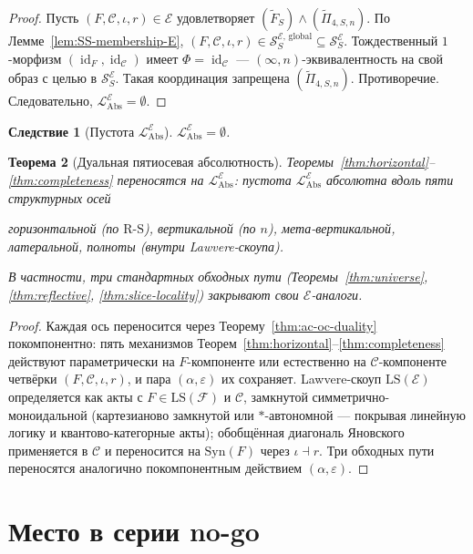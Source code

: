 \documentclass[11pt]{article}
\theoremstyle{plain}
\newtheorem{theorem}{Теорема}[section]
\newtheorem{corollary}[theorem]{Следствие}
\theoremstyle{definition}
\newcommand{\RS}{\mathrm{R\text{-}S}}
\newcommand{\cS}{\mathcal{S}}
\newcommand{\cF}{\mathcal{F}}
\newcommand{\cC}{\mathcal{C}}
\newcommand{\LAbs}{\mathcal{L}_{\mathrm{Abs}}}
\newcommand{\Syn}{\mathrm{Syn}}
\newcommand{\cE}{\mathcal{E}}
\newcommand{\LAbsE}{\LAbs^{\cE}}
\newcommand{\SSE}{\cS_{S}^{\cE}}
\DeclareMathOperator{\id}{id}
\newcommand{\SSEglobal}{\cS_{S}^{\cE,\,\mathrm{global}}}
\begin{document}
\begin{proof}
Пусть $(F, \cC, \iota, r) \in \cE$ удовлетворяет $(\tilde{F}_S) \wedge (\tilde{\Pi}_{4, S, n})$. По Лемме~\ref{lem:SS-membership-E}, $(F, \cC, \iota, r) \in \SSEglobal \subseteq \SSE$. Тождественный $1$-морфизм $(\id_F, \id_\cC)$ имеет $\Phi = \id_\cC$ — $(\infty, n)$-эквивалентность на свой образ с целью в $\SSE$. Такая координация запрещена $(\tilde{\Pi}_{4, S, n})$. Противоречие. Следовательно, $\LAbsE = \emptyset$.
\end{proof}

\begin{corollary}[Пустота $\LAbsE$]\label{cor:level6-empty-cE}
$\LAbsE = \emptyset$.
\end{corollary}

\begin{theorem}[Дуальная пятиосевая абсолютность]\label{thm:dual-five-axis}
Теоремы~\ref{thm:horizontal}--\ref{thm:completeness} переносятся на $\LAbs^\cE$: пустота $\LAbs^\cE$ абсолютна вдоль пяти структурных осей
\begin{center}
\emph{горизонтальной} (по $\RS$), \quad \emph{вертикальной} (по $n$), \quad \emph{мета-вертикальной}, \quad \emph{латеральной}, \quad \emph{полноты} (внутри Lawvere-скоупа).
\end{center}
В частности, три стандартных обходных пути (Теоремы~\ref{thm:universe}, \ref{thm:reflective}, \ref{thm:slice-locality}) закрывают свои $\cE$-аналоги.
\end{theorem}

\begin{proof}
Каждая ось переносится через Теорему~\ref{thm:ac-oc-duality} покомпонентно: пять механизмов Теорем~\ref{thm:horizontal}--\ref{thm:completeness} действуют параметрически на $F$-компоненте или естественно на $\cC$-компоненте четвёрки $(F, \cC, \iota, r)$, и пара $(\alpha, \varepsilon)$ их сохраняет. Lawvere-скоуп $\mathrm{LS}(\cE)$ определяется как акты с $F \in \mathrm{LS}(\cF)$ и $\cC$, замкнутой симметрично-моноидальной (картезианово замкнутой или $*$-автономной — покрывая линейную логику и квантово-категорные акты); обобщённая диагональ Яновского~\cite{Yanofsky2003} применяется в $\cC$ и переносится на $\Syn(F)$ через $\iota \dashv r$. Три обходных пути переносятся аналогично покомпонентным действием $(\alpha, \varepsilon)$.
\end{proof}

\section{Место в серии no-go}\label{sec:series}
\end{document}
